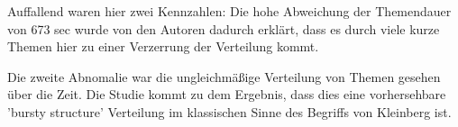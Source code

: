 Auffallend waren hier zwei Kennzahlen: Die hohe Abweichung der Themendauer von
673  sec wurde von den Autoren dadurch erklärt, dass es durch viele kurze Themen
hier zu einer Verzerrung der Verteilung kommt.

Die zweite Abnomalie war die ungleichmäßige Verteilung von Themen gesehen über
die Zeit. Die Studie kommt zu dem Ergebnis, dass dies eine vorhersehbare 'bursty
structure' Verteilung im klassischen Sinne des Begriffs von Kleinberg ist.
